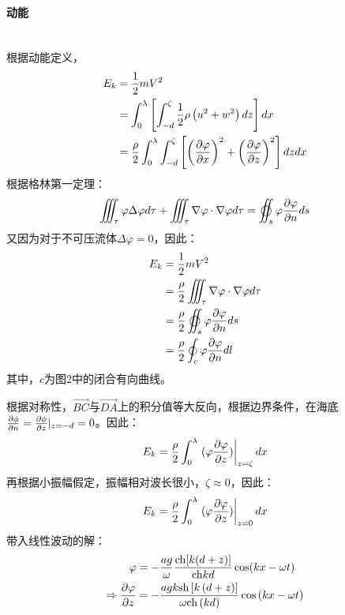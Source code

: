 \documentclass[a4paper,12pt]{article}
\begin{document}
	\paragraph{动能}~{}\\
	根据动能定义，
	\[
	\begin{aligned}
	    {E_k} &= {1 \over 2}m{V^2}\\
	    &=\int_{0}^{\lambda}\left[\int_{-d}^{\zeta} \frac{1}{2} \rho\left(u^{2}+w^{2}\right) d z\right] d x\\
	    &=\frac{\rho}{2} \int_{0}^{\lambda} \int_{-d}^{\zeta}\left[\left(\frac{\partial \varphi}{\partial x}\right)^{2}+\left(\frac{\partial \varphi}{\partial z}\right)^{2}\right] d z d x\\
	\end{aligned}
	\]
	\indent
	根据格林第一定理：
	$$\iiint_{\tau} \varphi \Delta \varphi d \tau+\iiint_{\tau} \nabla \varphi \cdot \nabla \varphi d \tau=\varoiint_{s} \varphi \frac{\partial \varphi}{\partial{n}	} d s$$
	又因为对于不可压流体$\Delta{\varphi}=0$，因此：
	\[
	\begin{aligned}
		{E_k} &= {1 \over 2}m{V^2}\\
	    &=\frac{\rho}{2} \iiint_{\tau} \nabla \varphi \cdot \nabla \varphi d \tau\\
	    &=\frac{\rho}{2} \varoiint_{s} \varphi \frac{\partial \varphi}{\partial n} d s\\
	    &=\frac{\rho}{2} \oint_{c} \varphi \frac{\partial \varphi}{\partial n} d l
	\end{aligned}
	\]
    其中，$c$为图2中的闭合有向曲线。
    \par
    根据对称性，$\overrightarrow{BC}$与$\overrightarrow{DA}$上的积分值等大反向，根据边界条件，在海底
    ${{\partial \phi } \over {\partial n}} = {{\partial \phi } \over {\partial z}}{|_{z =  - d}} = 0$。因此：
    \[
    {E_k} = {\rho  \over 2}\int_0^\lambda  {\left.(\varphi {{\partial \varphi } \over {\partial z}}) \right|_{z = \zeta}dx}
    \]
    \indent
    再根据小振幅假定，振幅相对波长很小，$\zeta\approx 0$，因此：
    \[
    {E_k} = {\rho  \over 2}\int_0^\lambda  {\left.(\varphi {{\partial \varphi } \over {\partial z}}) \right|_{z = 0}dx} 
    \]
	\indent
	带入线性波动的解：
	\[
	\begin{aligned}
		\varphi  &=  - {{ag} \over \omega }{{{\rm{ch}} [k(d + z)]} \over {{\rm{ch}} kd}}\cos (kx - \omega t)\\
		\Rightarrow\frac{\partial \varphi}{\partial z} & =-\frac{agk\mathrm{sh}\left[k\left(d+z\right) \right]}{\omega \mathrm{ch}\left(kd\right)}\cos\left(kx-\omega t\right)
	\end{aligned}
	\]
\end{document}
